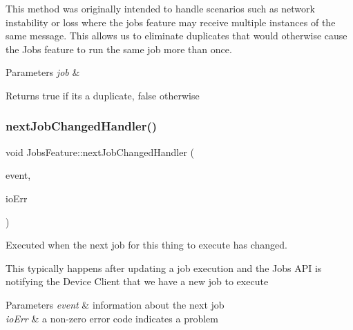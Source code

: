 This method was originally intended to handle scenarios such as network instability or loss where the jobs feature may receive multiple instances of the same message. This allows us to eliminate duplicates that would otherwise cause the Jobs feature to run the same job more than once. 
\begin{DoxyParams}{Parameters}
{\em job} & \\
\hline
\end{DoxyParams}
\begin{DoxyReturn}{Returns}
true if it\textquotesingle{}s a duplicate, false otherwise 
\end{DoxyReturn}
\mbox{\label{class_aws_1_1_iot_1_1_device_client_1_1_jobs_1_1_jobs_feature_a699398d2cdb6ad04950408f957d57cf0}} 
\subsubsection{\texorpdfstring{next\+Job\+Changed\+Handler()}{nextJobChangedHandler()}}
{\footnotesize\ttfamily void Jobs\+Feature\+::next\+Job\+Changed\+Handler (\begin{DoxyParamCaption}\item[{Iotjobs\+::\+Next\+Job\+Execution\+Changed\+Event $\ast$}]{event,  }\item[{int}]{io\+Err }\end{DoxyParamCaption})\hspace{0.3cm}{\ttfamily [private]}}



Executed when the next job for this thing to execute has changed. 

This typically happens after updating a job execution and the Jobs A\+PI is notifying the Device Client that we have a new job to execute 
\begin{DoxyParams}{Parameters}
{\em event} & information about the next job \\
\hline
{\em io\+Err} & a non-\/zero error code indicates a problem \\
\hline
\end{DoxyParams}
\mbox{\label{class_aws_1_1_iot_1_1_device_client_1_1_jobs_1_1_jobs_feature_a546393fde6216c790c95d6a7a6903ddc}} 
